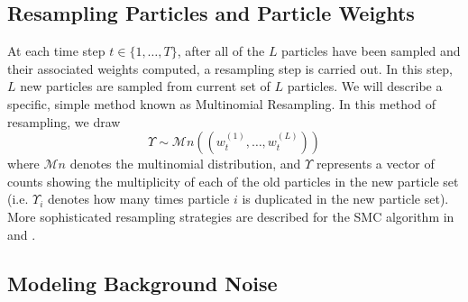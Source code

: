\documentclass[twocolumn, final]{svjour3}
\begin{document}





\subsection{Resampling Particles and Particle Weights}
\label{sec:resample}

At each time step $t \in \{ 1, \ldots, T \}$, after all of the $L$ particles have been sampled and their associated weights computed, a resampling step is carried out. In this step, $L$ new particles are sampled from current set of $L$ particles. We will describe a specific, simple method known as Multinomial Resampling. In this method of resampling, we draw
\begin{equation}
\Upsilon \sim \mathcal{M}n((w_{t}^{(1)}, \ldots, w_{t}^{(L)}))
\end{equation}
where $\mathcal{M}n$ denotes the multinomial distribution, and $\Upsilon$ represents a vector of counts showing the multiplicity of each of the old particles in the new particle set (i.e. $\Upsilon_{i}$ denotes how many times particle $i$ is duplicated in the new particle set). More sophisticated resampling strategies are described for the SMC algorithm in \cite{gasthaus_thesis} and \cite{douc2005comparison}.





\subsection{Modeling Background Noise}
\end{document}
